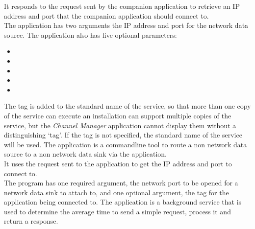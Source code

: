 It responds to the  request sent by the
companion application  to retrieve an IP address and port
that the companion application should connect to.\\

The application has two arguments \longDash{} the IP address and port for the network data
source.
The application also has five optional parameters:
\begin{itemize}
\item{}
\item\exSp{}
\item\exSp{}
\item\exSp{}
\item\exSp{}
\end{itemize}
The tag is added to the standard name of the service, so that more than one copy of the
service can execute \longDash{} an \mplusm{} installation can support multiple copies of
the  service, but the \emph{Channel Manager} application
cannot display them without a distinguishing `tag'.
If the tag is not specified, the standard name of the service will be used.
The  application is a command\longDash{}line tool to route a
non\longDash\yarp{} network data source to a non\longDash\yarp{} network data sink via
the  application.\\

It uses the  request sent to the
 application to get the IP address and port to connect
to.\\

The program has one required argument, the network port to be opened for a network data
sink to attach to, and one optional argument, the tag for the
 application being connected to.
The  application is a background service that is
used to determine the average time to send a simple request, process it and return a
response.\\

